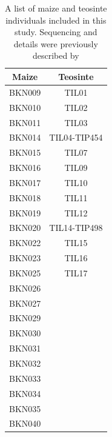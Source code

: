 \begin{table}
  \begin{center}
  \begin{tabular}{c|c}
    \bf Maize & \bf Teosinte \\ \hline \hline
    BKN009 &  TIL01 \\
    BKN010 & TIL02 \\
    BKN011 & TIL03 \\
    BKN014 & TIL04-TIP454 \\
    BKN015 & TIL07 \\
    BKN016 & TIL09 \\
    BKN017 & TIL10 \\
    BKN018 & TIL11 \\
    BKN019 & TIL12 \\
    BKN020 & TIL14-TIP498 \\
    BKN022 & TIL15 \\
    BKN023 & TIL16 \\
    BKN025 & TIL17 \\
    BKN026 & \\
    BKN027 & \\
    BKN029 & \\
    BKN030 & \\
    BKN031 & \\
    BKN032 & \\
    BKN033 & \\
    BKN034 & \\
    BKN035 & \\
    BKN040 & \\
  \end{tabular} 
  \end{center}
     \caption{ A list of maize and teosinte individuals included in this study. Sequencing and details were previously described by     }
\end{table}

